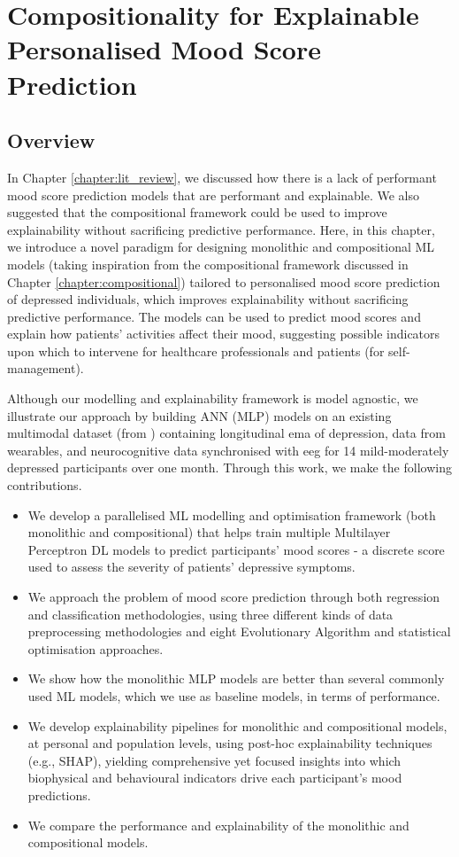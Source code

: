 \chapter{Compositionality for Explainable Personalised Mood Score Prediction} \label{chapter:depression}
\glsresetall

\section{Overview}

In Chapter \ref{chapter:lit_review}, we discussed how there is a lack of performant mood score prediction models that are performant and explainable. We also suggested that the compositional framework could be used to improve explainability without sacrificing predictive performance. Here, in this chapter, we introduce a novel paradigm for designing monolithic and compositional ML models (taking inspiration from the compositional framework discussed in Chapter \ref{chapter:compositional}) tailored to personalised mood score prediction of depressed individuals, which improves explainability without sacrificing predictive performance. The models can be used to predict mood scores and explain how patients' activities affect their mood, suggesting possible indicators upon which to intervene for healthcare professionals and patients (for self-management). 

Although our modelling and explainability framework is model agnostic, we illustrate our approach by building ANN (MLP) models on an existing multimodal dataset (from \cite{shah_personalized_2021}) containing longitudinal \gls{ema} of depression, data from wearables, and neurocognitive data synchronised with \gls{eeg} for 14 mild-moderately depressed participants over one month. Through this work, we make the following contributions.

\begin{itemize}
 \item We develop a parallelised ML modelling and optimisation framework (both monolithic and compositional) that helps train multiple Multilayer Perceptron DL models to predict participants' mood scores - a discrete score used to assess the severity of patients' depressive symptoms. 
 \item We approach the problem of mood score prediction through both regression and classification methodologies, using three different kinds of data preprocessing methodologies and eight Evolutionary Algorithm and statistical optimisation approaches.
 \item We show how the monolithic MLP models are better than several commonly used ML models, which we use as baseline models, in terms of performance.
 \item We develop explainability pipelines for monolithic and compositional models, at personal and population levels, using post-hoc explainability techniques (e.g., SHAP), yielding comprehensive yet focused insights into which biophysical and behavioural indicators drive each participant's mood predictions.
 \item We compare the performance and explainability of the monolithic and compositional models.
\end{itemize}

